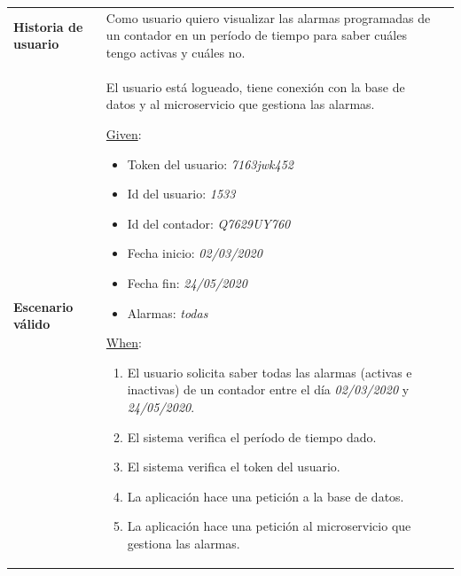 \documentclass[pdftex,11pt,a4paper]{book}
\begin{document}
\renewcommand{\tablename}{Tabla}
\renewcommand{\arraystretch}{1,7}

\begin{center}
\begin{longtable}{|>{\centering\arraybackslash}X m{2cm}|m{12cm}|}
\hline
\multicolumn{2}{|c|}{\textbf{Prueba de aceptación PA05}}\\
\hline 
\endhead

\textbf{Historia de usuario} & Como usuario quiero visualizar las alarmas programadas de un contador en un período de tiempo para saber cuáles tengo activas y cuáles no.

\\ \hline

\textbf{Escenario válido} & {\raggedright El usuario está logueado, tiene conexión con la base de datos y al microservicio que gestiona las alarmas.\par}
\vspace{2mm}
\break

\underline{Given}:
\begin{itemize}
\addtolength{\itemsep}{-3mm}
\item Token del usuario: \textit{7163jwk452}
\item Id del usuario: \textit{1533}
\item Id del contador: \textit{Q7629UY760}
\item Fecha inicio: \textit{02/03/2020}
\item Fecha fin: \textit{24/05/2020}
\item Alarmas: \textit{todas}

\end{itemize}
\vspace{3mm}

\underline{When}:
\begin{enumerate}
\vspace{-3mm}
\addtolength{\itemsep}{-3mm}
\item El usuario solicita saber todas las alarmas (activas e inactivas) de un contador entre el día \textit{02/03/2020} y \textit{24/05/2020}.
\item El sistema verifica el período de tiempo dado.
\item El sistema verifica el token del usuario.
\item La aplicación hace una petición a la base de datos.  
\item La aplicación hace una petición al microservicio que gestiona las alarmas.


\end{enumerate}
\end{longtable}
\end{center}
\end{document}
